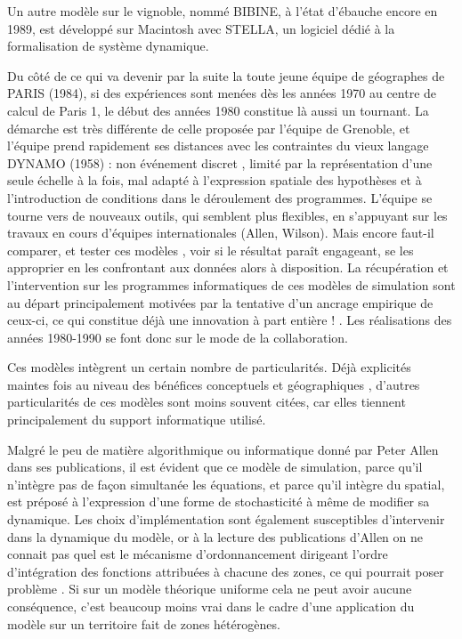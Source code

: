 Un autre modèle sur le vignoble, nommé BIBINE, à l'état d'ébauche encore en 1989, est développé sur Macintosh avec STELLA, un logiciel dédié à la formalisation de système dynamique. \autocite{Chamussy1989}

Du côté de ce qui va devenir par la suite la toute jeune équipe de géographes de PARIS (1984), si des expériences sont menées dès les années 1970 au centre de calcul de Paris 1, le début des années 1980 constitue là aussi un tournant. La démarche est très différente de celle proposée par l'équipe de Grenoble, et l'équipe prend rapidement ses distances avec les contraintes du vieux langage DYNAMO (1958) : non événement discret \autocite{Nance1993}, limité par la représentation d'une seule échelle à la fois, mal adapté à l'expression spatiale des hypothèses et à l'introduction de conditions dans le déroulement des programmes. L'équipe se tourne vers de nouveaux outils, qui semblent plus flexibles, en s'appuyant sur les travaux en cours d'équipes internationales (Allen, Wilson). Mais encore faut-il comparer, et tester ces modèles \autocite{Pumain1983}, voir si le résultat paraît engageant, se les approprier en les confrontant aux données alors à disposition. La récupération et l'intervention sur les programmes informatiques de ces modèles de simulation sont au départ principalement motivées par la tentative d’un ancrage empirique de ceux-ci, ce qui constitue déjà une innovation à part entière ! \autocite{Pumain1982}. Les réalisations des années 1980-1990 se font donc sur le mode de la collaboration.

Ces modèles intègrent un certain nombre de particularités. Déjà explicités maintes fois au niveau des bénéfices conceptuels et géographiques \autocites{Pumain1989, Sanders1992}, d'autres particularités de ces modèles sont moins souvent citées, car elles tiennent principalement du support informatique utilisé.

Malgré le peu de matière algorithmique ou informatique donné par Peter Allen dans ses publications, il est évident que ce modèle de simulation, parce qu'il n'intègre pas de façon simultanée les équations, et parce qu'il intègre du spatial, est préposé à l'expression d'une forme de stochasticité à même de modifier sa dynamique. Les choix d'implémentation sont également susceptibles d'intervenir dans la dynamique du modèle, or à la lecture des publications d'Allen on ne connait pas quel est le mécanisme d'ordonnancement dirigeant l'ordre d'intégration des fonctions attribuées à chacune des zones, ce qui pourrait poser problème \autocite[231-233]{Varenne2014b}. Si sur un modèle théorique uniforme cela ne peut avoir aucune conséquence, c'est beaucoup moins vrai dans le cadre d'une application du modèle sur un territoire fait de zones hétérogènes.

